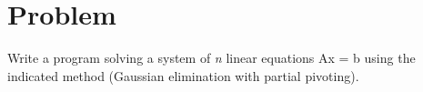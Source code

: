 \section{Problem}
Write a program solving a system of \textit{n} linear equations Ax = b using the indicated method (Gaussian elimination with partial pivoting).

